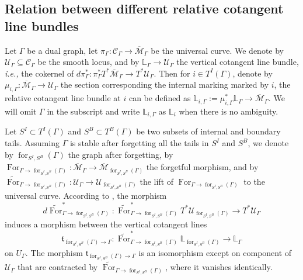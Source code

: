 \documentclass[11pt]{amsart}
\theoremstyle{definition}
\theoremstyle{remark}
\renewcommand{\for}{\operatorname{for}}
\newcommand{\For}{\operatorname{For}}
\newcommand{\<}{\left<}
\renewcommand{\>}{\right>}
\numberwithin{equation}{section}
\def\Mbar{{\overline{\mathcal M}}}
\begin{document}
\subsection{Relation between different relative cotangent line bundles}\label{sec cotangent lines relation}
Let $\Gamma$ be a %
dual graph, let %
$\pi_{\Gamma}\colon\mathcal C_{\Gamma}\to \Mbar_{\Gamma}$ be the universal curve. We denote by %
$\mathcal U_{\Gamma}\subseteq \mathcal C_{\Gamma}$ be the %
smooth locus, and %
by $\mathbb L_{\Gamma}\to \mathcal U_{\Gamma}$ the vertical cotangent line bundle, \textit{i.e.,} the cokernel of $d\pi^*_{\Gamma}\colon \pi^*_{\Gamma} T^*\Mbar_{\Gamma}\to T^* \mathcal U_{\Gamma}$. Then for $i\in T^I(\Gamma)$, denote by $\mu_{i,\Gamma}\colon \Mbar_{\Gamma}\to \mathcal U_{\Gamma}$ the %
section corresponding the %
internal marking marked %
by $i$, the %
relative cotangent line bundle at $i$ can be defined as $\mathbb L_{i,\Gamma}:=\mu_{i,\Gamma}^*\mathbb L_{\Gamma} \to \Mbar_{\Gamma}$. We will omit $\Gamma$ in the subscript and write $\mathbb L_{i,\Gamma}$ as $\mathbb L_{i}$ when there is no ambiguity.


Let $S^I\subset T^I(\Gamma)$ and $S^B\subset T^B(\Gamma)$ be two subsets of internal and boundary tails. Assuming $\Gamma$ is stable after forgetting all the tails in $S^I$ and $S^B$, we denote by $\for_{{S^I,S^B}}(\Gamma)$ the graph after forgetting, by $\For_{\Gamma \to \for_{{S^I,S^B}}(\Gamma)}\colon \Mbar_\Gamma\to \Mbar_{\for_{{S^I,S^B}}(\Gamma)}$ the forgetful morphism, and by $\widetilde{\For}_{\Gamma \to \for_{{S^I,S^B}}(\Gamma)}\colon \mathcal U_{\Gamma} \to \mathcal U_{\for_{{S^I,S^B}}(\Gamma)}$ the lift of $\For_{\Gamma \to \for_{{S^I,S^B}}(\Gamma)}$ to the universal curve. According to \cite[\S3.5]{PST14}, the morphism 
$$d\widetilde{\For}^*_{\Gamma \to \for_{{S^I,S^B}}(\Gamma)}\colon \widetilde{\For}_{\Gamma \to \for_{{S^I,S^B}}(\Gamma)}^*T^*\mathcal U_{\for_{{S^I,S^B}}(\Gamma)}\to T^*\mathcal U_{\Gamma}$$ induces a morphism between the vertical cotangent lines $$\mathfrak t_{\for_{{S^I,S^B}}(\Gamma)\to \Gamma}\colon \widetilde{\For}_{\Gamma\to \for_{{S^I,S^B}}(\Gamma)}^*\mathbb L_{\for_{{S^I,S^B}}(\Gamma)}\to \mathbb L_{\Gamma}$$
on $U_{\Gamma}$.
The morphism $\mathfrak t_{\for_{{S^I,S^B}}(\Gamma)\to\Gamma}$ is an isomorphism except %
on component of %
$\mathcal U_{\Gamma}$ that are contracted by $\widetilde{\For}_{\Gamma \to \for_{{S^I,S^B}}(\Gamma)}$, where it vanishes identically. 
\end{document}
